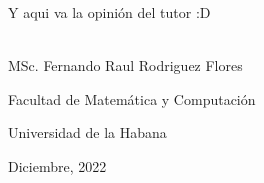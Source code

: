 \begin{opinion}
    Y aqui va la opinión del tutor :D

    \vspace{1cm}


    \begin{flushright}
        \underline{\hspace{6.5cm}}\\
        MSc. Fernando Raul Rodriguez Flores

        Facultad de Matemática y Computación

        Universidad de la Habana

        Diciembre, 2022
    \end{flushright}

\end{opinion}